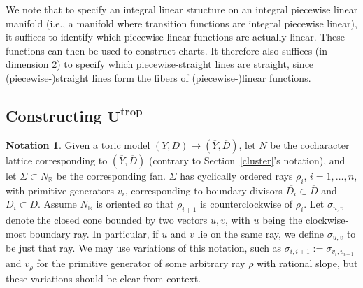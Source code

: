 \documentclass[10pt,a4paper]{amsart}
\numberwithin{equation}{section}
\numberwithin{figure}{section}
\numberwithin{table}{section}
\DeclareMathOperator{\trop}{trop}
\let\?=\overline
\let\bb=\mathbb
\let\rar=\rightarrow
\theoremstyle{definition}
\newtheorem{ntn}[thm]{Notation}
\begin{document}
We note that to specify an integral linear structure on an integral piecewise linear manifold (i.e., a manifold where transition functions are integral piecewise linear), it suffices to identify which piecewise linear functions are actually linear. These functions can then be used to construct charts. It therefore also suffices (in dimension $2$) to specify which piecewise-straight lines are straight, since (piecewise-)straight lines form the fibers of (piecewise-)linear functions.

\subsection[Constructing $U^{\trop}$]{Constructing $\boldsymbol{U^{\trop}}$} \label{Ut}

\begin{ntn}\label{UtropNotation} Given a toric model $(Y,D) \rar (\?{Y},\?{D})$, let $N$ be the cocharacter lattice corresponding to $(\?{Y},\?{D})$ (contrary to Section~\ref{cluster}'s notation), and let $\Sigma\subset N_{\bb{R}}$ be the corresponding fan. $\Sigma$ has cyclically ordered rays $\rho_i$, $i=1,\dots,n$, with primitive generators $v_i$, corresponding to boundary divisors $\?{D_i}\subset \?{D}$ and $D_i \subset D$. Assume $N_{\bb{R}}$ is oriented so that $\rho_{i+1}$ is counterclockwise of $\rho_i$. Let $\sigma_{u,v}$ denote the closed cone bounded by two vectors $u,v$, with $u$ being the clockwise-most boundary ray. In particular, if $u$ and $v$ lie on the same ray, we define $\sigma_{u,v}$ to be just that ray. We may use variations of this notation, such as $\sigma_{i,i+1}:=\sigma_{v_i,v_{i+1}}$ and $v_{\rho}$ for the primitive generator of some arbitrary ray $\rho$ with rational slope, but these variations should be clear from context.
\end{ntn}
\end{document}

